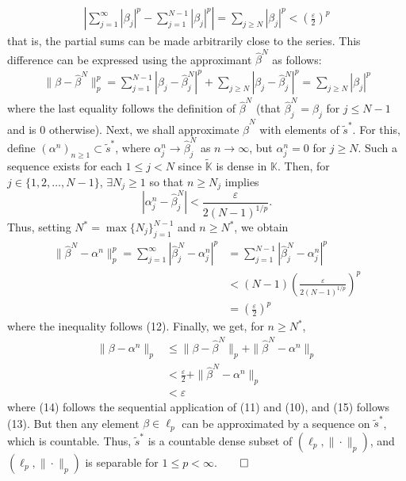 \documentclass[10pt]{article}
\newcommand{\mbb}[1]{\mathbb{#1}}
\newcommand{\1}[1]{\mathbbm{1}_{#1}}
\begin{document}
    \begin{align*}
        \left|\sum_{j=1}^\infty|\beta_j|^p-\sum_{j=1}^{N-1}|\beta_j|^p\right|=\sum_{j\geq N}|\beta_j|^p<\left(\frac{\varepsilon}{2}\right)^{p}\tag{10}
    \end{align*}
    that is, the partial sums can be made arbitrarily close to the series. This difference can be expressed using the approximant $\hat{\beta}^N$ as follows:
    \begin{align*}
        \|\beta-\hat{\beta}^N\|_p^p=\sum_{j=1}^{N-1}|\beta_j-\hat{\beta}_j^N|^p+\sum_{j\geq N}|\beta_j-\hat{\beta}_j^N|^p=\sum_{j\geq N}|\beta_j|^p\tag{11}
    \end{align*}
    where the last equality follows the definition of $\hat{\beta}^N$ (that $\hat{\beta}^N_j=\beta_j$ for $j\leq N-1$ and is $0$ otherwise). Next, we shall approximate $\hat{\beta}^N$ with elements of $\widetilde{s}^\ast$.
    For this, define $(\alpha^n)_{n\geq 1}\subset\widetilde{s}^\ast$, where $\alpha^n_j\rightarrow\hat{\beta}^N_j$ as $n\rightarrow\infty$, but $\alpha^n_j=0$ for $j\geq N$. Such a sequence exists for each
    $1\leq j<N$ since $\widetilde{\mbb{K}}$ is dense in $\mbb{K}$. Then, for $j\in\{1,2,\dots,N-1\}$, $\exists N_j\geq 1$ so that $n\geq N_j$ implies
    \[|\alpha^n_j-\hat{\beta}^N_j|<\frac{\varepsilon}{2(N-1)^{1/p}}.\tag{12}\]
    Thus, setting $N^\ast=\max\{N_j\}_{j=1}^{N-1}$ and $n\geq N^\ast$, we obtain
    \begin{align*}
        \|\hat{\beta}^N-\alpha^n\|_p^p=\sum_{j=1}^\infty|\hat{\beta}^N_j-\alpha^n_j|^p&=\sum_{j=1}^{N-1}|\hat{\beta}^N_j-\alpha^n_j|^p\\
        &<(N-1)\left(\frac{\varepsilon}{2(N-1)^{1/p}}\right)^p\\
        &=\left(\frac{\varepsilon}{2}\right)^p\tag{13}
    \end{align*}
    where the inequality follows (12). Finally, we get, for $n\geq N^\ast$,
    \begin{align*}
        \|\beta-\alpha^n\|_p&\leq\|\beta-\hat{\beta}^N\|_p+\|\hat{\beta}^N-\alpha^n\|_p\\
        &<\frac{\varepsilon}{2}+\|\hat{\beta}^N-\alpha^n\|_p\tag{14}\\
        &<\varepsilon\tag{15}
    \end{align*}
    where (14) follows the sequential application of (11) and (10), and (15) follows (13). But then any element $\beta\in\ell_p$ can be
    approximated by a sequence on $\widetilde{s}^\ast$, which is countable. Thus, $\widetilde{s}^\ast$ is a countable dense subset of $(\ell_p,\|\cdot\|_p)$, and $(\ell_p,\|\cdot\|_p)$ is
    separable for $1\leq p<\infty$.\hfill{$\qed$}
    
\end{document}
